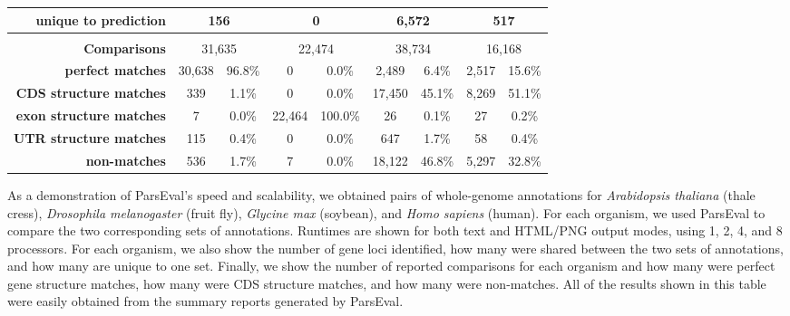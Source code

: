 \begin{table}
\begin{tabularx}{\textwidth}{rc cc cc cc c}
 {\scriptsize \textbf{unique to prediction}} & \multicolumn{2}{c}{{\scriptsize 156}} & \multicolumn{2}{c}{{\scriptsize 0}} & \multicolumn{2}{c}{{\scriptsize 6,572}} & \multicolumn{2}{c}{\scriptsize {517}} \\ \hline
 \multicolumn{9}{c}{} \\ \hline
 \textbf{Comparisons} & \multicolumn{2}{c}{31,635} & \multicolumn{2}{c}{22,474} & \multicolumn{2}{c}{38,734} & \multicolumn{2}{c}{16,168} \\ \hline
 {\scriptsize \textbf{perfect matches}} & {\scriptsize 30,638} & {\scriptsize 96.8\%} & {\scriptsize 0} & {\scriptsize 0.0\%} & {\scriptsize 2,489} & {\scriptsize 6.4\%} & {\scriptsize 2,517} & {\scriptsize 15.6\% } \\
 {\scriptsize \textbf{CDS structure matches}} & {\scriptsize 339} & {\scriptsize 1.1\%} & {\scriptsize 0} & {\scriptsize 0.0\%} & {\scriptsize 17,450} & {\scriptsize 45.1\%} & {\scriptsize 8,269} & {\scriptsize 51.1\% } \\
 {\scriptsize \textbf{exon structure matches}} & {\scriptsize 7} & {\scriptsize 0.0\%} & {\scriptsize 22,464} & {\scriptsize 100.0\%} & {\scriptsize 26} & {\scriptsize 0.1\%} & {\scriptsize 27} & {\scriptsize 0.2\% } \\
 {\scriptsize \textbf{UTR structure matches}} & {\scriptsize 115} & {\scriptsize 0.4\%} & {\scriptsize 0} & {\scriptsize 0.0\%} & {\scriptsize 647} & {\scriptsize 1.7\%} & {\scriptsize 58} & {\scriptsize 0.4\% } \\
 {\scriptsize \textbf{non-matches}} & {\scriptsize 536} & {\scriptsize 1.7\%} & {\scriptsize 7} & {\scriptsize 0.0\%} & {\scriptsize 18,122} & {\scriptsize 46.8\%} & {\scriptsize 5,297} & {\scriptsize 32.8\% } \\ \hline
\end{tabularx}
\label{Table:ParsEvalBenchmarks}
\raggedright
{\scriptsize
As a demonstration of ParsEval's speed and scalability, we obtained pairs of whole-genome annotations for \textit{Arabidopsis thaliana} (thale cress), \textit{Drosophila melanogaster} (fruit fly), \textit{Glycine max} (soybean), and \textit{Homo sapiens} (human).
For each organism, we used ParsEval to compare the two corresponding sets of annotations.
Runtimes are shown for both text and HTML/PNG output modes, using 1, 2, 4, and 8 processors.
For each organism, we also show the number of gene loci identified, how many were shared between the two sets of annotations, and how many are unique to one set.
Finally, we show the number of reported comparisons for each organism and how many were perfect gene structure matches, how many were CDS structure matches, and how many were non-matches.
All of the results shown in this table were easily obtained from the summary reports generated by ParsEval.
}
\end{table}


